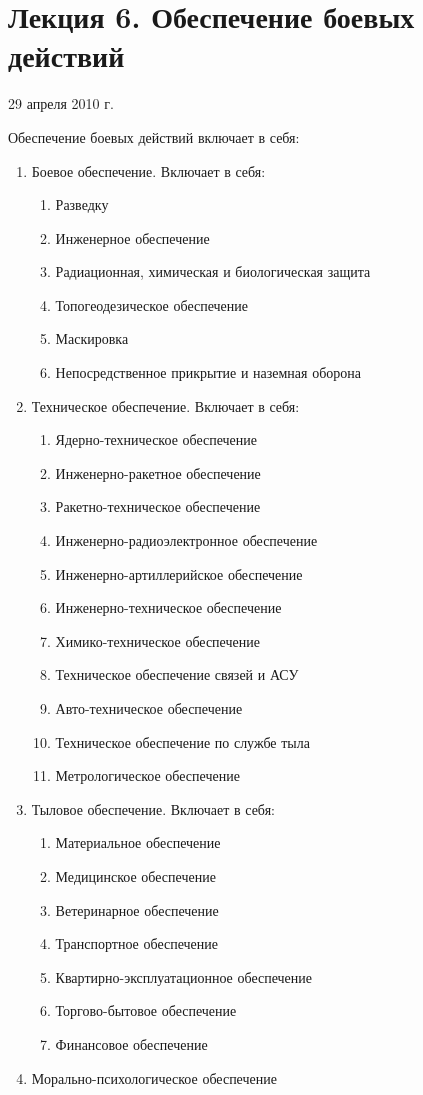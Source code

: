 \documentclass[a4paper,12pt]{article}
\begin{document}
	\section{\bf Лекция 6. Обеспечение боевых действий}
	\centerline{29 апреля 2010 г.}
	Обеспечение боевых действий включает в себя:
	\begin{enumerate}
		\item Боевое обеспечение. Включает в себя:
		\begin{enumerate}
			\item Разведку
			\item Инженерное обеспечение
			\item Радиационная, химическая и биологическая защита
			\item Топогеодезическое обеспечение
			\item Маскировка
			\item Непосредственное прикрытие и наземная оборона
		\end{enumerate}		
		\item Техническое обеспечение. Включает в себя:
		\begin{enumerate}
			\item Ядерно-техническое обеспечение
			\item Инженерно-ракетное обеспечение
			\item Ракетно-техническое обеспечение
			\item Инженерно-радиоэлектронное обеспечение
			\item Инженерно-артиллерийское обеспечение
			\item Инженерно-техническое обеспечение
			\item Химико-техническое обеспечение
			\item Техническое обеспечение связей и АСУ
			\item Авто-техническое обеспечение
			\item Техническое обеспечение по службе тыла
			\item Метрологическое обеспечение
		\end{enumerate}
		\item Тыловое обеспечение. Включает в себя:
		\begin{enumerate}
			\item Материальное обеспечение
			\item Медицинское обеспечение
			\item Ветеринарное обеспечение
			\item Транспортное обеспечение
			\item Квартирно-эксплуатационное обеспечение
			\item Торгово-бытовое обеспечение
			\item Финансовое обеспечение
		\end{enumerate}
		\item Морально-психологическое обеспечение
	\end{enumerate}
\end{document}
